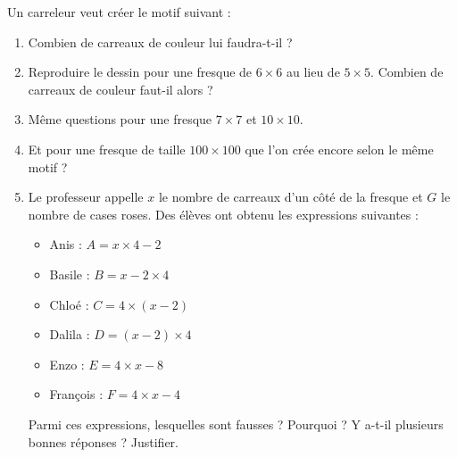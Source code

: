 
Un carreleur veut créer le motif suivant :
\begin{center}
   
\end{center}
\begin{enumerate}
    \item
Combien de carreaux de couleur lui faudra-t-il ? 
\item
Reproduire le dessin pour une fresque de \( 6\times 6\) au lieu de \( 5\times 5\). Combien de carreaux de couleur faut-il alors ? 
\item
    Même questions pour une fresque \( 7\times 7\) et \( 10\times 10\).
\item
Et pour une fresque de taille \( 100\times 100\) que l'on crée encore selon le même motif ?
\item
Le professeur appelle $x$ le nombre de carreaux d'un côté de la fresque et $G$ le nombre de cases roses. Des élèves ont obtenu les expressions suivantes :
\begin{multicols}{3}
    \begin{itemize}
        \item
            Anis : \( A=x\times 4-2\)
        \item
            Basile : \( B=x-2\times 4\)
        \item
            Chloé : \( C=4\times (x-2)\)
        \item
             Dalila : \( D=(x-2)\times 4 \)
         \item
             Enzo : \( E=4\times x-8\)
         \item
             François : \( F=4\times x-4\)
    \end{itemize}
\end{multicols}
Parmi ces expressions, lesquelles sont fausses ? Pourquoi ? Y a-t-il plusieurs bonnes réponses ? Justifier.
\end{enumerate}


